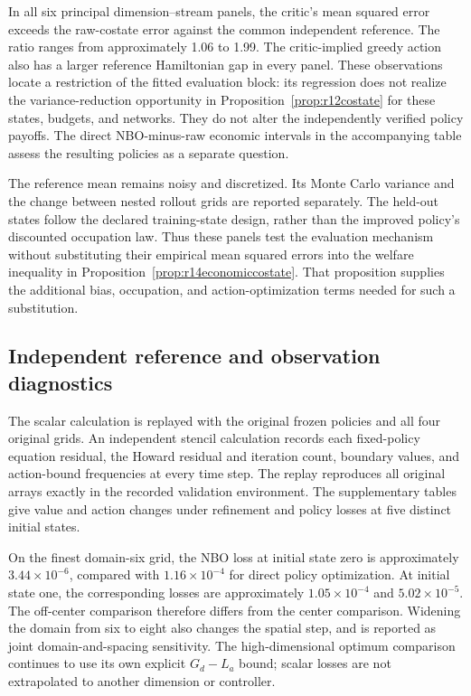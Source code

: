 In all six principal dimension--stream panels, the critic's mean squared error exceeds the raw-costate error against the common independent reference. The ratio ranges from approximately 1.06 to 1.99. The critic-implied greedy action also has a larger reference Hamiltonian gap in every panel. These observations locate a restriction of the fitted evaluation block: its regression does not realize the variance-reduction opportunity in Proposition~\ref{prop:r12costate} for these states, budgets, and networks. They do not alter the independently verified policy payoffs. The direct NBO-minus-raw economic intervals in the accompanying table assess the resulting policies as a separate question.

The reference mean remains noisy and discretized. Its Monte Carlo variance and the change between nested rollout grids are reported separately. The held-out states follow the declared training-state design, rather than the improved policy's discounted occupation law. Thus these panels test the evaluation mechanism without substituting their empirical mean squared errors into the welfare inequality in Proposition~\ref{prop:r14economiccostate}. That proposition supplies the additional bias, occupation, and action-optimization terms needed for such a substitution.

\subsection{Independent reference and observation diagnostics}
The scalar calculation is replayed with the original frozen policies and all four original grids. An independent stencil calculation records each fixed-policy equation residual, the Howard residual and iteration count, boundary values, and action-bound frequencies at every time step. The replay reproduces all original arrays exactly in the recorded validation environment. The supplementary tables give value and action changes under refinement and policy losses at five distinct initial states.

On the finest domain-six grid, the NBO loss at initial state zero is approximately $3.44\times10^{-6}$, compared with $1.16\times10^{-4}$ for direct policy optimization. At initial state one, the corresponding losses are approximately $1.05\times10^{-4}$ and $5.02\times10^{-5}$. The off-center comparison therefore differs from the center comparison. Widening the domain from six to eight also changes the spatial step, and is reported as joint domain-and-spacing sensitivity. The high-dimensional optimum comparison continues to use its own explicit $G_d-L_a$ bound; scalar losses are not extrapolated to another dimension or controller.

